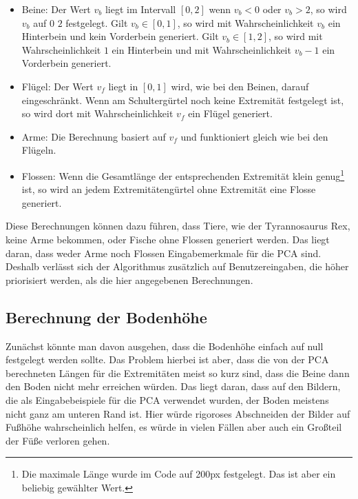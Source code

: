 \begin{itemize}
 \item Beine: Der Wert $v_b$ liegt im Intervall $[0, 2]$ \bzw wenn $v_b < 0$ oder $v_b > 2$, so wird $v_b$ auf $0$ \bzw $2$ festgelegt. Gilt $v_b \in [0, 1]$, so wird mit Wahrscheinlichkeit $v_b$ ein Hinterbein und kein Vorderbein generiert. Gilt $v_b \in [1, 2]$, so wird mit Wahrscheinlichkeit $1$ ein Hinterbein und mit Wahrscheinlichkeit $v_b - 1$ ein Vorderbein generiert.
 
 \item Flügel: Der Wert $v_f$ liegt in $[0, 1]$ \bzw wird, wie bei den Beinen, darauf eingeschränkt. Wenn am Schultergürtel noch keine Extremität festgelegt ist, so wird dort mit Wahrscheinlichkeit $v_f$ ein Flügel generiert.
 
 \item Arme: Die Berechnung basiert auf $v_f$ und funktioniert gleich wie bei den Flügeln.
 
 \item Flossen: Wenn die Gesamtlänge der entsprechenden Extremität klein genug\footnote{Die maximale Länge wurde im Code auf 200px festgelegt. Das ist aber ein beliebig gewählter Wert.} ist, so wird an jedem Extremitätengürtel ohne Extremität eine Flosse generiert.
\end{itemize}

Diese Berechnungen können dazu führen, dass Tiere, wie der Tyrannosaurus Rex, keine Arme bekommen, oder Fische ohne Flossen generiert werden. Das liegt daran, dass weder Arme noch Flossen Eingabemerkmale für die PCA sind. Deshalb verlässt sich der Algorithmus zusätzlich auf Benutzereingaben, die höher priorisiert werden, als die hier angegebenen Berechnungen.

\subsection{Berechnung der Bodenhöhe}
\label{floor_height}

Zunächst könnte man davon ausgehen, dass die Bodenhöhe einfach auf null festgelegt werden sollte. Das Problem hierbei ist aber, dass die von der PCA berechneten Längen für die Extremitäten meist so kurz sind, dass die Beine dann den Boden nicht mehr erreichen würden. Das liegt daran, dass auf den Bildern, die als Eingabebeispiele für die PCA verwendet wurden, der Boden meistens nicht ganz am unteren Rand ist. Hier würde rigoroses Abschneiden der Bilder auf Fußhöhe wahrscheinlich helfen, es würde in vielen Fällen aber auch ein Großteil der Füße verloren gehen.

